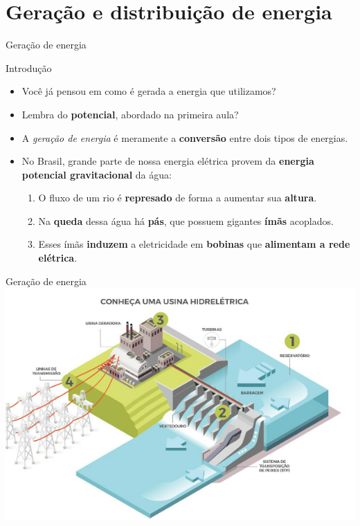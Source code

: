 \section{Geração e distribuição de energia}


\begin{frame}{Geração de energia}
	\begin{block}{Introdução}
		\begin{itemize}
			\item Você já pensou em como é gerada a energia que utilizamos?
			\item Lembra do \textbf{potencial}, abordado na primeira aula?
			\item A \textit{geração de energia }é meramente a \textbf{conversão }entre dois tipos de energias.
			\item No Brasil, grande parte de nossa energia elétrica provem da \textbf{energia potencial gravitacional} da água:
			      \begin{enumerate}
				      \item\normalsize O fluxo de um rio é \textbf{represado} de forma a aumentar sua \textbf{altura}.
				      \item\normalsize Na \textbf{queda} dessa água há \textbf{pás}, que possuem gigantes \textbf{ímãs} acoplados.
				      \item\normalsize Esses ímãs \textbf{induzem} a eletricidade em \textbf{bobinas} que \textbf{alimentam a rede elétrica}.
			      \end{enumerate}
		\end{itemize}
	\end{block}
\end{frame}


\begin{frame}{Geração de energia}
	\centering
	\includegraphics[width=1\linewidth]{Figuras/Ch03/fig1}
\end{frame}


